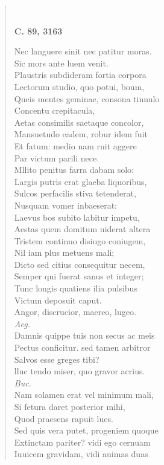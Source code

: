 \documentclass[11pt, a4paper]{report}
\begin{document}
\begin{verse}
        ﻿\pagebreak 
     \marginpar{[336]} \begin{center} \textbf{C. 89, 3163} \end{center}Nec languere sinit nec patitur moras. \\ Sic mors ante luem venit. \\ Plaustris subdideram fortia corpora \\ Lectorum studio, quo potui, boum, \\ Queis mentes geminae, consona tinnulo \\ Concentu crepitacula, \\ Aetas consimilis saetaque concolor, \\ Mansuetudo eadem, robur idem fuit \\ Et fatum: medio nam ruit aggere \\ Par victum parili nece. \\ Mllito penitus farra dabam solo: \\ Largis putris erat glaeba liquoribus, \\ Sulcos perfacilis stiva tetenderat, \\ Nusquam vomer inbaeserat: \\ Laevus bos subito labitur impetu, \\ Aestas quem domitum uiderat altera \\ Tristem continuo disiugo coniugem, \\ Nil iam plus metuens mali; \\ Dicto sed citius consequitur necem, \\ Semper qui fuerat  \lbrack sanus \rbrack  et integer; \\ Tunc longis quatiens ilia pulsibus \\ Victum deposuit caput. \\ Angor, discrucior, maereo, lugeo. \\ \textit{Aeg.} \\ Damnis quippe tuis non secus ac meis \\ Pectus conficitur. sed tamen arbitror \\ Salvos esse greges tibi? \\ lluc tendo miser, quo gravor acrius. \\ \textit{Buc.} \\ Nam solamen erat vel minimum mali, \\ Si fetura daret posterior mihi, \\ Quod praesens rapuit lues. \\ Sed quis vera putet, progeniem quoque \\ Extinctam pariter? vidi ego cernuam \\ Iuuicem gravidam, vidi auimas duas \\ 

\end{verse}
\end{document}
